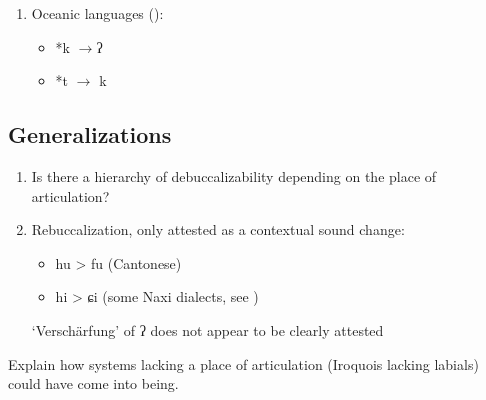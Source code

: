 \documentclass[oldfontcommands,oneside,a4paper,11pt]{article}
\newcommand{\ipa}[1]{{\phon \mbox{#1}}} %
\begin{document}
\begin{enumerate}
\begin{enumerate}
\item Oceanic languages (\citealt{blust04tk}):
 
 \begin{itemize}
\item \ipa{*k} $\rightarrow $\ipa{ʔ}
\item \ipa{*t} $\rightarrow$ \ipa{k}  
\end{itemize} 
 \end{enumerate}
 \end{enumerate}
 
 

 
  \subsection{Generalizations}
 \begin{enumerate}
\item Is there a hierarchy of debuccalizability depending on the place of articulation? %

\item  Rebuccalization, only attested as a contextual sound change:
 \begin{itemize}
\item hu > fu (Cantonese)
\item hi > ɕi (some Naxi dialects, see \citealt{michaud06neutralisation})
 \end{itemize}
`Verschärfung' of ʔ does not appear to be clearly attested
 \end{enumerate}
 
 
 Explain how systems lacking a place of articulation (Iroquois lacking labials) could have come into being.
 
 


\end{document}
